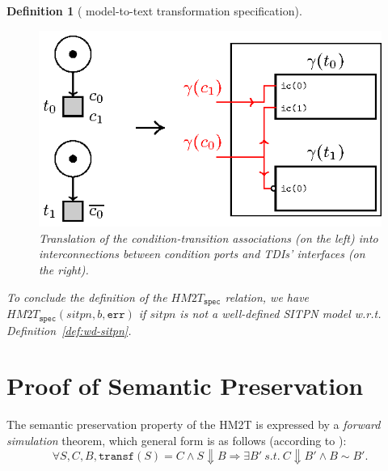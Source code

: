 \documentclass[pdflatex,sn-mathphys]{sn-jnl}%
\theoremstyle{thmstyleone}%
\theoremstyle{thmstyletwo}%
\theoremstyle{thmstylethree}%
\newtheorem{definition}{Definition}%
\begin{document}
\begin{definition}[\hilecop{} model-to-text transformation specification]
  \begin{figure}[h]
    \centering
    \includegraphics[keepaspectratio,width=.65\textwidth]{gen-conds.eps}
    \caption{Translation of the condition-transition associations (on
      the left) into interconnections between condition ports and
      TDIs' interfaces (on the right). }
    \label{fig:gen-conds}
  \end{figure}

  To conclude the definition of the $HM2T_{\mathtt{spec}}$ relation,
  we have $HM2T_{\mathtt{spec}}(sitpn,b,\mathtt{err})$ if $sitpn$ is
  not a well-defined SITPN model w.r.t. Definition~\ref{def:wd-sitpn}.
\end{definition}

\section{Proof of Semantic Preservation}
\label{sec:proof}

The semantic preservation property of the HM2T is expressed by a
\textit{forward simulation} theorem, which general form is as follows
(according to \cite{Leroy2009}):
\begin{equation*}
  \forall{}S,C,B,\mathtt{transf}(S)=C\land{}S\Downarrow{}B\Rightarrow{}\exists{}B'~s.t.~C\Downarrow{}B'\land{}B\sim{}B'.
\end{equation*}
\end{document}
